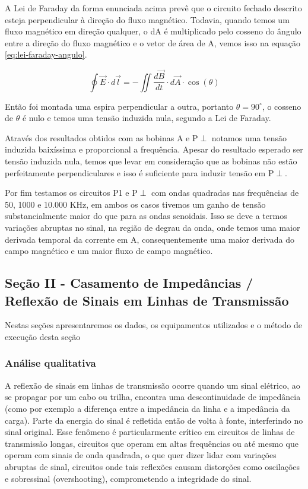 \documentclass[12pt]{article}
\begin{document}
A Lei de Faraday da forma enunciada acima prevê que o circuito
fechado descrito esteja perpendicular à direção do fluxo magnético.
Todavia, quando temos um fluxo magnético em direção qualquer, o dA é
multiplicado pelo cosseno do ângulo entre a direção do fluxo
magnético e o vetor de área de A, vemos isso na equação
\ref{eq:lei-faraday-angulo}.

\begin{equation}
  \label{eq:lei-faraday-angulo}
  \oint \vec{E} \cdot d\vec{l} = -\iint \frac{d\vec{B}}{dt}   \cdot
  d\vec{A} \cdot \cos(\theta)
\end{equation}

Então foi montada uma espira perpendicular a outra, portanto
$\theta=90^\circ$, o cosseno de $\theta$ é nulo e temos uma tensão induzida
nula, segundo a Lei de Faraday.

Através dos resultados obtidos com as bobinas A e P$\perp$ notamos uma
tensão induzida baixíssima e proporcional a frequência. Apesar do
resultado esperado ser tensão induzida nula, temos que levar em
consideração que as bobinas não estão perfeitamente perpendiculares e
isso é suficiente para induzir tensão em P$\perp$.

Por fim testamos os circuitos P1 e P$\perp$ com ondas quadradas nas
frequências de 50, 1000 e 10.000 KHz, em ambos os casos tivemos um
ganho de tensão substancialmente maior do que para as ondas
senoidais. Isso se deve a termos variações abruptas no sinal, na
região de degrau da onda, onde temos uma maior derivada temporal da
corrente em A, consequentemente uma maior derivada do campo magnético
e um maior fluxo de campo magnético.

\subsection{Seção II - Casamento de Impedâncias / Reflexão de Sinais
em Linhas de Transmissão}
Nestas seções apresentaremos os dados, os equipamentos utilizados e o
método de execução desta seção

\subsubsection{Análise qualitativa}

A reflexão de sinais em linhas de transmissão ocorre quando um sinal
elétrico, ao se propagar por um cabo ou trilha, encontra uma
descontinuidade de impedância (como por exemplo a diferença entre a
impedância da linha e a impedância da carga). Parte da energia do
sinal é refletida então de volta à fonte, interferindo no sinal
original. Esse fenômeno é particularmente crítico em circuitos de
linhas de transmissão longas, circuitos que operam em altas
frequências ou até mesmo que operam com sinais de onda quadrada, o
que quer dizer lidar com variações abruptas de sinal, circuitos onde
tais reflexões causam distorções como oscilações e sobressinal
(overshooting), comprometendo a integridade do sinal.
\end{document}
